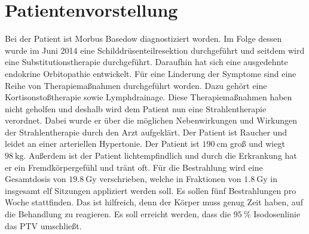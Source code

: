 \section{Patientenvorstellung}
\label{sec:Patientenvorstellung}

Bei der Patient ist Morbus Basedow diagnostiziert worden.
Im Folge dessen wurde im Juni 2014 eine Schilddrüsenteilresektion durchgeführt und seitdem wird eine Substitutionstherapie durchgeführt.
Daraufhin hat sich eine ausgedehnte endokrine Orbitopathie entwickelt.
Für eine Linderung der Symptome sind eine Reihe von Therapiemaßnahmen durchgeführt worden. Dazu gehört eine Kortisonstoßtherapie sowie Lymphdrainage.
Diese Therapiemaßnahmen haben nicht geholfen und deshalb wird dem Patient nun eine Strahlentherapie verordnet.
Dabei wurde er über die möglichen Nebenwirkungen und Wirkungen der Strahlentherapie durch den Arzt aufgeklärt.
Der Patient ist Raucher und leidet an einer arteriellen Hypertonie. Der Patient ist $\SI{190}{\centi\meter}$ groß und wiegt $\SI{98}{\kilogram}$. Außerdem ist der Patient lichtempfindlich und durch die Erkrankung hat er ein Fremdkörpergefühl und tränt oft.
Für die Bestrahlung wird eine Gesamtdosis von $\SI{19,8}{\gray}$ verschrieben, welche in Fraktionen von $\SI{1,8}{\gray}$ in insgesamt elf Sitzungen
appliziert werden soll. Es sollen fünf Bestrahlungen pro Woche stattfinden. Das ist hilfreich, denn der Körper muss genug Zeit haben,
auf die Behandlung zu reagieren. Es soll erreicht werden, dass die $\SI{95}{\percent}$ Isodosenlinie das PTV umschließt.
